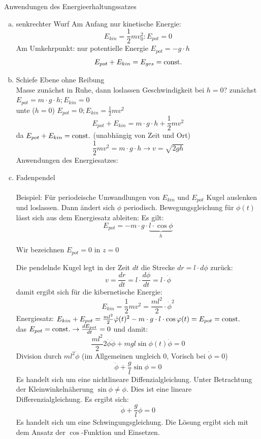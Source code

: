 \documentclass[a4paper,10pt]{scrartcl}
\begin{document}
\begin{seg}{Anwendungen des Energieerhaltungssatzes}
 \begin{enumerate}[a)]
  \item senkrechter Wurf
Am Anfang nur kinetische Energie:
\[
 E_{kin}=\frac{1}{2} m v_0^2: E_{pot}=0
\]
Am Umkehrpunkt:
nur potentielle Energie $E_{pot}=-g\cdot h$\\
\[
 E_{pot}+E_{kin}=E_{ges}=\text{const}.
\]
\item Schiefe Ebene ohne Reibung
\\
Masse zunächst in Ruhe, dann loslassen Geschwindigkeit bei $h=0$? zunächst $E_{pot}=m\cdot g\cdot h; E_{kin}=0$\\
unte ($h=0$) $E_{pot}=0; E_{kin}=\frac{1}{2} mv^2$
\[
 E_{pot}+E_{kin}=m\cdot g\cdot h+\frac{1}{2} m v^2
\]
da $E_{pot} +E_{kin}=\text{const}.$ (unabhängig von Zeit und Ort)
\[
 \frac{1}{2} mv^2=m\cdot g\cdot h\to v=\sqrt{2gh}
\]
Anwendungen des Energiesatzes:
\item Fadenpendel\\
\\
Beispiel: Für periodeische Umwandlungen von $E_{kin}$ und $E_{pot}$ Kugel auslenken und loslassen. Dann ändert sich $\phi$ periodisch.
Bewegungsgleichung für $\phi(t)$ lässt sich aus dem Energiesatz ableiten:
Es gilt: 
\[\boxed{E_{pot}=-m\cdot g\cdot \underbrace{l\cdot \cos{\phi}}_h}\]
\begin{df}[Energienullpunkt]
 Wir bezeichnen $E_{pot}=0$ in $z=0$
\end{df}
Die pendelnde Kugel legt in der Zeit $dt$ die Strecke $dr=l\cdot d\phi$ zurück:
\[
 v=\frac{dr}{dt}=l\cdot \frac{d\phi}{dt}=l\cdot \dot \phi
\]
damit ergibt sich für die kibernetische Energie:
\[
 \boxed{E_{kin}=\frac{1}{2}mv^2=\frac{ml^2}{2}\cdot \dot \phi^2}
\]
Energiesatz: $E_{kin}+E_{pot}=\frac{ml^2}{2}\dot {\varphi}(t)^2-m\cdot g\cdot l\cdot \cos{\varphi(t)}=E_{pot}=\text{const}.$\\
das $E_{pot}=\text{const}.\rightarrow \frac{dE_{pot}}{dt}=0$ und damit:
\[
 \frac{ml^2}{2}2\dot \phi \ddot \phi+mgl\sin\phi(t)\dot \phi=0
\]
Division durch $ml^2\dot \phi$ (im Allgemeinen ungleich $0$, Vorisch bei $\dot \phi=0$)\\
\[
 \boxed{\ddot\phi+\frac{g}{l}\sin\phi=0}
\]
Es handelt sich um eine nichtlineare Diffenzialgleichung. Unter Betrachtung der Kleinwinkelnäherung $\sin\phi\neq \phi$.  Dies ist eine lineare Differenzialgleichung. Es ergibt sich:
\[
 \boxed{\ddot \phi+\frac{g}{l}\phi=0}
\]
Es handelt sich um eine Schwingungsgleichung. Die Lösung ergibt sich mit dem Ansatz der $\cos$-Funktion und Einsetzen.\\

\end{enumerate}
\end{seg}
\end{document}
